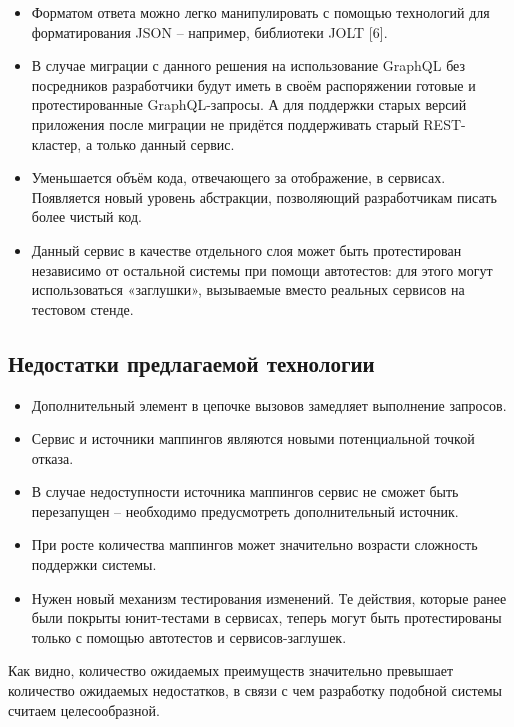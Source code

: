 \begin{itemize}
	\item Форматом ответа можно легко манипулировать с помощью технологий для форматирования JSON – например, библиотеки JOLT [6].
	\item В случае миграции с данного решения на использование GraphQL без посредников разработчики будут иметь в своём распоряжении готовые и протестированные GraphQL-запросы.
	А для поддержки старых версий приложения после миграции не придётся поддерживать старый REST-кластер, а только данный сервис.
	\item Уменьшается объём кода, отвечающего за отображение, в сервисах.
	Появляется новый уровень абстракции, позволяющий разработчикам писать более чистый код.
	\item Данный сервис в качестве отдельного слоя может быть протестирован независимо от остальной системы при помощи автотестов: для этого могут использоваться «заглушки», вызываемые вместо реальных сервисов на тестовом стенде.
\end{itemize}

\subsection{Недостатки предлагаемой технологии}\label{sec:proposed-technology-disadvantages}

\begin{itemize}
	\item Дополнительный элемент в цепочке вызовов замедляет выполнение запросов.
	\item Сервис и источники маппингов являются новыми потенциальной точкой отказа.
	\item В случае недоступности источника маппингов сервис не сможет быть перезапущен – необходимо предусмотреть дополнительный источник.
	\item При росте количества маппингов может значительно возрасти сложность поддержки системы.
	\item Нужен новый механизм тестирования изменений.
	Те действия, которые ранее были покрыты юнит-тестами в сервисах, теперь могут быть протестированы только с помощью автотестов и сервисов-заглушек.
\end{itemize}

Как видно, количество ожидаемых преимуществ значительно превышает количество ожидаемых недостатков, в связи с чем разработку подобной системы считаем целесообразной.




